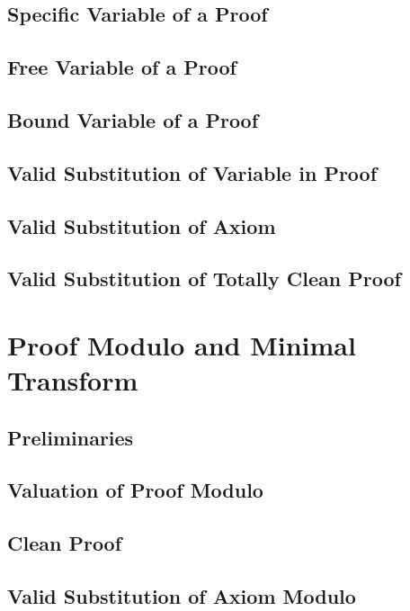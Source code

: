 \documentclass{report}
\begin{document}
    \subsection{Specific Variable of a Proof}
      
    \subsection{Free Variable of a Proof}
      
    \subsection{Bound Variable of a Proof}
      
    \subsection{Valid Substitution of Variable in Proof}
      
    \subsection{Valid Substitution of Axiom}
      
    \subsection{Valid Substitution of Totally Clean Proof}
      
\section{Proof Modulo and Minimal Transform}
    \subsection{Preliminaries}
      
    \subsection{Valuation of Proof Modulo}
      
    \subsection{Clean Proof}
      
    \subsection{Valid Substitution of Axiom Modulo}
      
\end{document}
